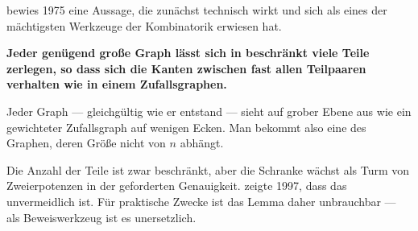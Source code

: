 \begin{merksatz}
 bewies 1975 eine Aussage, die zunächst technisch wirkt und sich als eines der mächtigsten Werkzeuge der Kombinatorik erwiesen hat.

\begin{center}
\begin{minipage}{0.9\textwidth}
\textbf{Jeder genügend große Graph lässt sich in beschränkt viele Teile zerlegen, so dass sich die Kanten zwischen fast allen Teilpaaren verhalten wie in einem Zufallsgraphen.}
\end{minipage}
\end{center}

Jeder Graph --- gleichgültig wie er entstand --- sieht auf grober Ebene aus wie ein gewichteter Zufallsgraph auf wenigen Ecken. Man bekommt also eine  des Graphen, deren Größe nicht von $n$ abhängt.

Die Anzahl der Teile ist zwar beschränkt, aber die Schranke wächst als Turm von Zweierpotenzen in der geforderten Genauigkeit.  zeigte 1997, dass das unvermeidlich ist. Für praktische Zwecke ist das Lemma daher unbrauchbar --- als Beweiswerkzeug ist es unersetzlich.

\begin{center}
\begin{minipage}{0.88\textwidth}
\end{minipage}
\end{center}
\end{merksatz}

